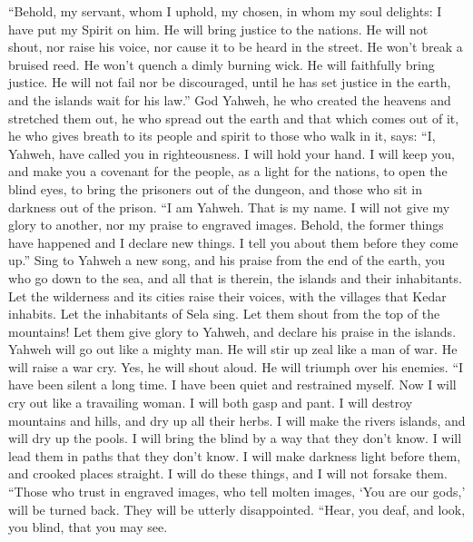  ``Behold, my servant, whom I uphold, my chosen, in whom my
soul delights: I have put my Spirit on him. He will bring justice to the
nations.  He will not shout, nor raise his voice, nor cause
it to be heard in the street.  He won't break a bruised
reed. He won't quench a dimly burning wick. He will faithfully bring
justice.  He will not fail nor be discouraged, until he has
set justice in the earth, and the islands wait for his law.''
 God Yahweh, he who created the heavens and stretched them
out, he who spread out the earth and that which comes out of it, he who
gives breath to its people and spirit to those who walk in it, says:
 ``I, Yahweh, have called you in righteousness. I will hold
your hand. I will keep you, and make you a covenant for the people, as a
light for the nations,  to open the blind eyes, to bring the
prisoners out of the dungeon, and those who sit in darkness out of the
prison.  ``I am Yahweh. That is my name. I will not give my
glory to another, nor my praise to engraved images.  Behold,
the former things have happened and I declare new things. I tell you
about them before they come up.''  Sing to Yahweh a new
song, and his praise from the end of the earth, you who go down to the
sea, and all that is therein, the islands and their inhabitants.
 Let the wilderness and its cities raise their voices, with
the villages that Kedar inhabits. Let the inhabitants of Sela sing. Let
them shout from the top of the mountains!  Let them give
glory to Yahweh, and declare his praise in the islands. 
Yahweh will go out like a mighty man. He will stir up zeal like a man of
war. He will raise a war cry. Yes, he will shout aloud. He will triumph
over his enemies.  ``I have been silent a long time. I have
been quiet and restrained myself. Now I will cry out like a travailing
woman. I will both gasp and pant.  I will destroy mountains
and hills, and dry up all their herbs. I will make the rivers islands,
and will dry up the pools.  I will bring the blind by a way
that they don't know. I will lead them in paths that they don't know. I
will make darkness light before them, and crooked places straight. I
will do these things, and I will not forsake them.  ``Those
who trust in engraved images, who tell molten images, `You are our
gods,' will be turned back. They will be utterly disappointed.
 ``Hear, you deaf, and look, you blind, that you may see.
